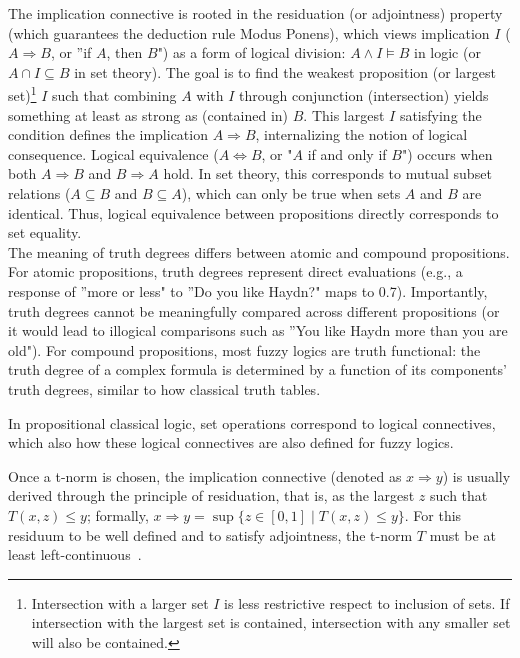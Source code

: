 The implication connective is rooted in the residuation (or adjointness) property (which guarantees the deduction rule Modus Ponens), which views implication $I$ ($A \Rightarrow B$, or ''if $A$, then $B$") as a form of logical division: $A \land I \models B$ in logic (or $A \cap I \subseteq B$ in set theory). The goal is to find the weakest proposition (or largest set)\footnote{Intersection with a larger set $I$ is less restrictive respect to inclusion of sets. If intersection with the largest set is contained, intersection with any smaller set will also be contained.} $I$ such that combining $A$ with $I$ through conjunction (intersection) yields something at least as strong as (contained in) $B$. This largest $I$ satisfying the condition defines the implication $A \Rightarrow B$, internalizing the notion of logical consequence. Logical equivalence ($A \iff B$, or "$A$ if and only if $B$") occurs when both $A \Rightarrow B$ and $B \Rightarrow A$ hold. In set theory, this corresponds to mutual subset relations ($A \subseteq B$ and $B \subseteq A$), which can only be true when sets $A$ and $B$ are identical. Thus, logical equivalence between propositions directly corresponds to set equality.\\

The meaning of truth degrees differs between atomic and compound propositions. For atomic propositions, truth degrees represent direct evaluations (e.g., a response of ''more or less" to ''Do you like Haydn?" maps to 0.7). Importantly, truth degrees cannot be meaningfully compared across different propositions (or it would lead to illogical comparisons such as ''You like Haydn more than you are old"). For compound propositions, most fuzzy logics are truth functional: the truth degree of a complex formula is determined by a function of its components' truth degrees, similar to how classical truth tables.\\

\begin{remark}
    In propositional classical logic, set operations correspond to logical connectives, which also how these logical connectives are also defined for fuzzy logics.
\end{remark}

 Once a t-norm is chosen, the implication connective (denoted as $x \Rightarrow y$) is usually derived through the principle of residuation, that is, as the largest $z$ such that $T(x, z) \le y$; formally, $x \Rightarrow y = \sup\{z \in [0,1] \mid T(x, z) \le y\}$. For this residuum to be well defined and to satisfy adjointness, the t-norm $T$ must be at least left-continuous~\cite[p.272]{GodoMonoidal}.\\

